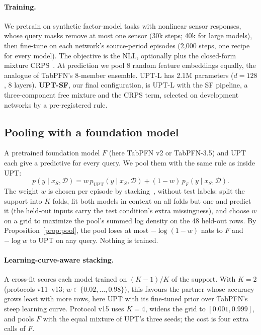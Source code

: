 \documentclass{article}
\newcommand{\D}{\mathcal{D}}
\begin{document}
\paragraph{Training.} We pretrain on synthetic factor-model tasks with nonlinear sensor responses, whose query masks
remove at most one sensor (30k steps; 40k for large models), then fine-tune on each network's source-period episodes
(2{,}000 steps, one recipe for every model). The objective is the NLL, optionally plus the closed-form mixture
CRPS~\citep{grimit2006crps}. At prediction we pool 8 random feature embeddings equally, the analogue of TabPFN's
8-member ensemble. UPT-L has 2.1M parameters ($d=128$, 8 layers). \textbf{UPT-SF}, our final configuration, is UPT-L
with the SF pipeline, a three-component free mixture and the CRPS term, selected on development networks by a
pre-registered rule.

\subsection{Pooling with a foundation model}
\label{sec:pool}

A pretrained foundation model $F$ (here TabPFN v2 or TabPFN-3.5) and UPT each give a predictive for every query. We pool them with
the same rule as inside UPT:
\[
  p(y\mid x_S,\D)=w\,p_{\mathrm{UPT}}(y\mid x_S,\D)+(1-w)\,p_F(y\mid x_S,\D).
\]
The weight $w$ is chosen per episode by stacking~\citep{yao2018stacking}, without test labels: split the support
into $K$ folds, fit both models in context on all folds but one and predict it (the held-out inputs carry the test
condition's extra missingness), and choose $w$ on a grid to maximize the pool's summed log density on the 48 held-out
rows. By Proposition~\ref{prop:pool}, the pool loses at most $-\log(1-w)$ nats to $F$ and $-\log w$ to UPT on any
query. Nothing is trained.

\paragraph{Learning-curve-aware stacking.} A cross-fit scores each model trained on $(K-1)/K$ of the support. With
$K=2$ (protocols v11--v13; $w\in\{0.02,\dots,0.98\}$), this favours the partner whose accuracy grows least with more
rows, here UPT with its fine-tuned prior over TabPFN's steep learning curve. Protocol v15 uses $K=4$, widens the grid to
$[0.001,0.999]$, and pools $F$ with the equal mixture of UPT's three seeds; the cost is four extra calls of $F$.
\end{document}
